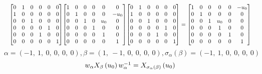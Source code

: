 \documentclass[11pt]{article}
\theoremstyle{definition}
\begin{document}
\[
\scaletoalign{\textwidth}{{\left[\begin{matrix}0 & 1 & 0 & 0 & 0 & 0\\1 & 0 & 0 & 0 & 0 & 0\\0 & 0 & 1 & 0 & 0 & 0\\0 & 0 & 0 & 0 & 1 & 0\\0 & 0 & 0 & 1 & 0 & 0\\0 & 0 & 0 & 0 & 0 & 1\end{matrix}\right]} {\left[\begin{matrix}1 & 0 & 0 & 0 & 0 & 0\\0 & 1 & 0 & 0 & 0 & - u_{0}\\0 & 0 & 1 & 0 & u_{0} & 0\\0 & 0 & 0 & 1 & 0 & 0\\0 & 0 & 0 & 0 & 1 & 0\\0 & 0 & 0 & 0 & 0 & 1\end{matrix}\right]} {\left[\begin{matrix}0 & 1 & 0 & 0 & 0 & 0\\1 & 0 & 0 & 0 & 0 & 0\\0 & 0 & 1 & 0 & 0 & 0\\0 & 0 & 0 & 0 & 1 & 0\\0 & 0 & 0 & 1 & 0 & 0\\0 & 0 & 0 & 0 & 0 & 1\end{matrix}\right]} = {\left[\begin{matrix}1 & 0 & 0 & 0 & 0 & - u_{0}\\0 & 1 & 0 & 0 & 0 & 0\\0 & 0 & 1 & u_{0} & 0 & 0\\0 & 0 & 0 & 1 & 0 & 0\\0 & 0 & 0 & 0 & 1 & 0\\0 & 0 & 0 & 0 & 0 & 1\end{matrix}\right]}}
\]
\[
\alpha = \left( -1, \  1, \  0, \  0, \  0, \  0\right), \beta = \left( 1, \  -1, \  0, \  0, \  0, \  0\right), \sigma_{\alpha}(\beta) = \left( -1, \  1, \  0, \  0, \  0, \  0\right)
\]
\[
\scaletoalign{\textwidth}{w_{\alpha} X_{\beta}\left(u_{0}\right) w_{\alpha}^{-1} = X_{\sigma_{\alpha}\left(\beta\right)}\left(u_{0}\right)}
\]
\end{document}

